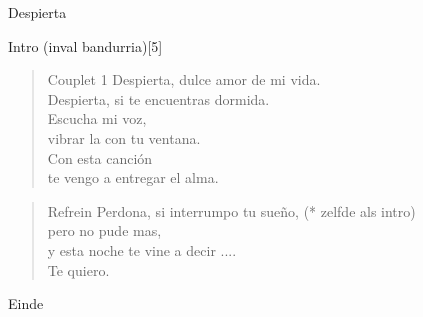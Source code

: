 \begin{song}[tango]{Despierta}


\begin{instrumental}{Intro \textnormal{(inval bandurria)}}[5]
    
\measure{}   
\end{instrumental}{}

\begin{verse}{Couplet 1}
  Despierta, dulce amor de mi vida.\\
  Despierta, si te encuentras dormida. \\
  Escucha mi voz, \chord{}   \\
  vibrar la con tu ventana.  \\
  Con esta canci\'{o}n \chord{}   \\
  te vengo a entregar el alma.
\end{verse}

\begin{verse}{Refrein}
  Perdona, \hspace{4em} si interrumpo tu sue\~{n}o,  \hspace{3em} (* zelfde als intro)\\
  pero no pude mas,  \\
  y esta noche te vine a decir ....  \\
  Te quiero.
\end{verse}


\begin{instrumental}{Einde}
\end{instrumental}

\end{song}

